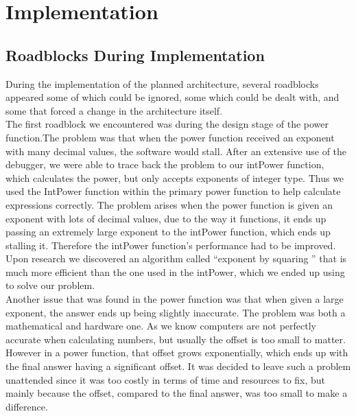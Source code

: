 \documentclass[a4paper, 12pt]{article}
\begin{document}
\section{Implementation}

\subsection{Roadblocks During Implementation}

During the implementation of the planned architecture, several roadblocks appeared some of which could be ignored, some which could be dealt with, and some that forced a change in the architecture itself.
\\

The first roadblock we encountered was during the design stage of the power function.The problem was that when the power function received an exponent with many decimal values, the software would stall. After an extensive use of the debugger, we were able to trace back the problem to our  intPower function, which calculates the power, but only accepts exponents of integer type. Thus we used the IntPower function within the primary power function to help calculate expressions correctly. The problem arises when the power function is given an exponent with lots of decimal values, due to the way it functions, it ends up passing an extremely large exponent to the intPower function, which ends up stalling it. Therefore the intPower function’s performance had to be improved. Upon research we discovered an algorithm called “exponent by squaring ”  that is much more efficient than the one used in the intPower, which we ended up using to solve our problem.
\\

Another issue that was found in the power function was that when given a large exponent, the answer ends up being slightly inaccurate. The problem was both a mathematical and hardware one. As we know computers are not perfectly accurate when calculating numbers, but usually the offset is too small to matter. However in a power function, that offset grows exponentially, which ends up with the final answer having a significant offset. It was decided to leave such a problem unattended since it was too costly in terms of time and resources to fix, but mainly because the offset, compared to the final answer, was too small to make a difference.
\\
\end{document}
